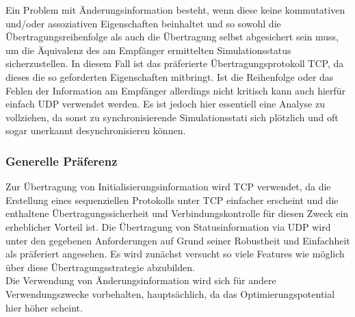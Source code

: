 \documentclass[11pt,twoside,a4paper]{article}
\begin{document}
\begin{enumerate}
Ein Problem mit Änderungsinformation besteht, wenn diese keine kommutativen und/oder assoziativen Eigenschaften beinhaltet und so sowohl die Übertragungsreihenfolge als auch die Übertragung selbst abgesichert sein muss, um die Äquivalenz des am Empfänger ermittelten Simulationsstatus sicherzustellen. In diesem Fall ist das präferierte Übertragungsprotokoll TCP, da dieses die so geforderten Eigenschaften mitbringt. Ist die Reihenfolge oder das Fehlen der Information am Empfänger allerdings nicht kritisch kann auch hierfür einfach UDP verwendet werden. Es ist jedoch hier essentiell eine Analyse zu vollziehen, da sonst zu synchronisierende Simulationsstati sich plötzlich und oft sogar unerkannt desynchronisieren können.

\end{enumerate}

\subsubsection{Generelle Präferenz}
Zur Übertragung von Initialisierungsinformation wird TCP verwendet, da die Erstellung eines sequenziellen Protokolls unter TCP einfacher erscheint und die enthaltene Übertragungssicherheit und Verbindungskontrolle für diesen Zweck ein erheblicher Vorteil ist.
Die Übertragung von Statusinformation via UDP wird unter den gegebenen Anforderungen auf Grund seiner Robustheit und Einfachheit als präferiert angesehen. Es wird zunächst versucht so viele Features wie möglich über diese Übertragungsstrategie abzubilden.\\
Die Verwendung von Änderungsinformation wird sich für andere Verwendungszwecke vorbehalten, hauptsächlich, da das Optimierungspotential hier höher scheint.
\end{document}
